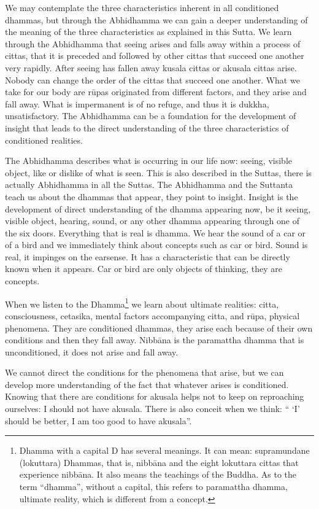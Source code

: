 We may contemplate the three characteristics inherent in all conditioned dhammas, but through the Abhidhamma we can gain a deeper understanding of the meaning of the three characteristics as explained in this Sutta. We learn through the Abhidhamma that seeing arises and falls away within a process of cittas, that it is preceded and followed by other cittas that succeed one another very rapidly. After seeing has fallen away kusala cittas or akusala cittas arise. Nobody can change the order of the cittas that succeed one another. What we take for our body are rūpas originated from different factors, and they arise and fall away. What is impermanent is of no refuge, and thus it is dukkha, unsatisfactory. The Abhidhamma can be a foundation for the development of insight that leads to the direct understanding of the three characteristics of conditioned realities.

The Abhidhamma describes what is occurring in our life now: seeing, visible object, like or dislike of what is seen. This is also described in the Suttas, there is actually Abhidhamma in all the Suttas. The Abhidhamma and the Suttanta teach us about the dhammas that appear, they point to insight. Insight is the development of direct understanding of the dhamma appearing now, be it seeing, visible object, hearing, sound, or any other dhamma appearing through one of the six doors. Everything that is real is dhamma. We hear the sound of a car or of a bird and we immediately think about concepts such as car or bird. Sound is real, it impinges on the earsense. It has a characteristic that can be directly known when it appears. Car or bird are only objects of thinking, they are concepts.

When we listen to the Dhamma\footnote{Dhamma with a capital D has several meanings. It can mean: supramundane (lokuttara) Dhammas, that is, nibbāna and the eight lokuttara cittas that experience nibbāna. It also means the teachings of the Buddha. As to the term ``dhamma'', without a capital, this refers to paramattha dhamma, ultimate reality, which is different from a concept.} we learn about ultimate realities: citta, consciousness, cetasika, mental factors accompanying citta, and rūpa, physical phenomena. They are conditioned dhammas, they arise each because of their own conditions and then they fall away. Nibbāna is the paramattha dhamma that is unconditioned, it does not arise and fall away.

We cannot direct the conditions for the phenomena that arise, but we can develop more understanding of the fact that whatever arises is conditioned. Knowing that there are conditions for akusala helps not to keep on reproaching ourselves: I should not have akusala. There is also conceit when we think: `` `I' should be better, I am too good to have akusala''.

